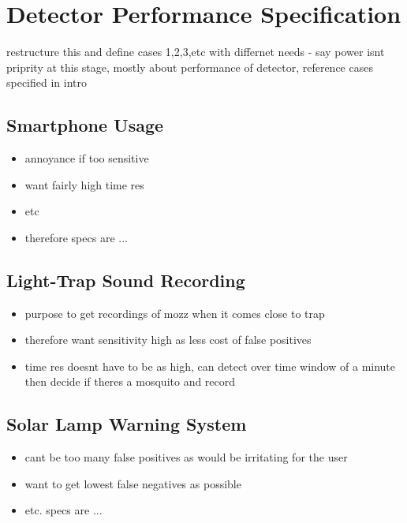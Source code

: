 \section{Detector Performance Specification}
\label{sec:exp-spec}
    restructure this and define cases 1,2,3,etc with differnet needs - say power isnt priprity at this stage, mostly about performance of detector, reference cases specified in intro
    \subsection{Smartphone Usage}
    \label{subsec:exp-spec-phone}
        \begin{itemize}
            \item{annoyance if too sensitive}
            \item{want fairly high time res}
            \item{etc}
            \item{therefore specs are ...}
        \end{itemize}
    
    \subsection{Light-Trap Sound Recording}
    \label{subsec:exp-spec-trap}
        \begin{itemize}
            \item{purpose to get recordings of mozz when it comes close to trap}
            \item{therefore want sensitivity high as less cost of false positives}
            \item{time res doesnt have to be as high, can detect over time window of a minute then decide if theres a mosquito and record}
        \end{itemize}
        
    \subsection{Solar Lamp Warning System}
    \label{subsec:exp-spec-lamp}
        \begin{itemize}
            \item{cant be too many false positives as would be irritating for the user}
            \item{want to get lowest false negatives as possible}
            \item{etc. specs are ...}
        \end{itemize}